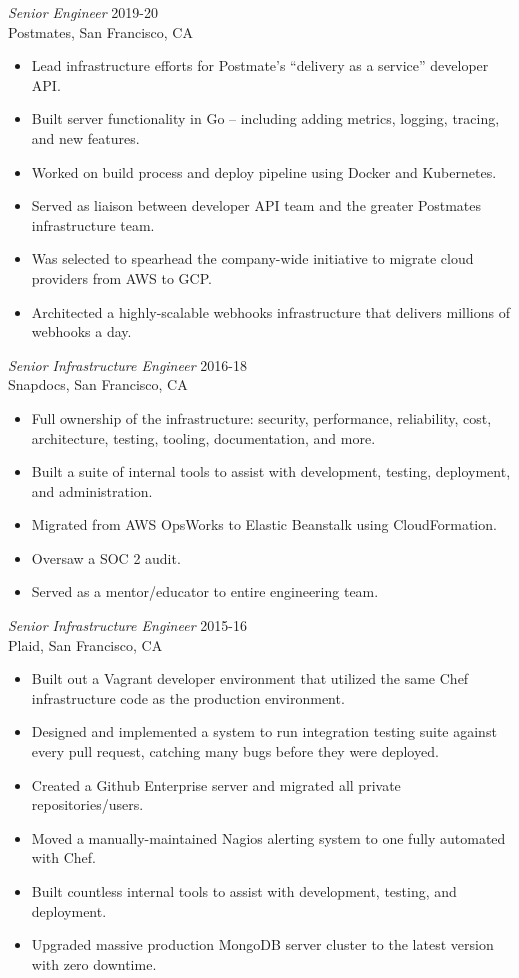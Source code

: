\documentclass[line,margin]{res}
\begin{document}
\begin{resume}
  {\sl Senior Engineer}  \hfill 2019-20 \\
  Postmates,
  San Francisco, CA
  \begin{itemize}  \itemsep -2pt %
    \item Lead infrastructure efforts for Postmate's ``delivery as a service'' developer API.
    \item Built server functionality in Go -- including adding metrics, logging, tracing, and new features.
    \item Worked on build process and deploy pipeline using Docker and Kubernetes.
    \item Served as liaison between developer API team and the greater Postmates infrastructure team.
    \item Was selected to spearhead the company-wide initiative to migrate cloud providers from AWS to GCP.
    \item Architected a highly-scalable webhooks infrastructure that delivers millions of webhooks a day.
  \end{itemize}

  {\sl Senior Infrastructure Engineer}  \hfill 2016-18 \\
  Snapdocs,
  San Francisco, CA
  \begin{itemize}  \itemsep -2pt %
    \item Full ownership of the infrastructure: security, performance, reliability, cost, architecture, testing, tooling, documentation, and more.
    \item Built a suite of internal tools to assist with development, testing, deployment, and administration.
    \item Migrated from AWS OpsWorks to Elastic Beanstalk using CloudFormation.
    \item Oversaw a SOC 2 audit.
    \item Served as a mentor/educator to entire engineering team.
  \end{itemize}

  {\sl Senior Infrastructure Engineer}  \hfill 2015-16 \\
  Plaid,
  San Francisco, CA
  \begin{itemize}  \itemsep -2pt %
    \item Built out a Vagrant developer environment that utilized the same Chef infrastructure code as the production environment.
    \item Designed and implemented a system to run integration testing suite against every pull request, catching many bugs before they were deployed.
    \item Created a Github Enterprise server and migrated all private repositories/users.
    \item Moved a manually-maintained Nagios alerting system to one fully automated with Chef.
    \item Built countless internal tools to assist with development, testing, and deployment.
    \item Upgraded massive production MongoDB server cluster to the latest version with zero downtime.
  \end{itemize}


\end{resume}
\end{document}
